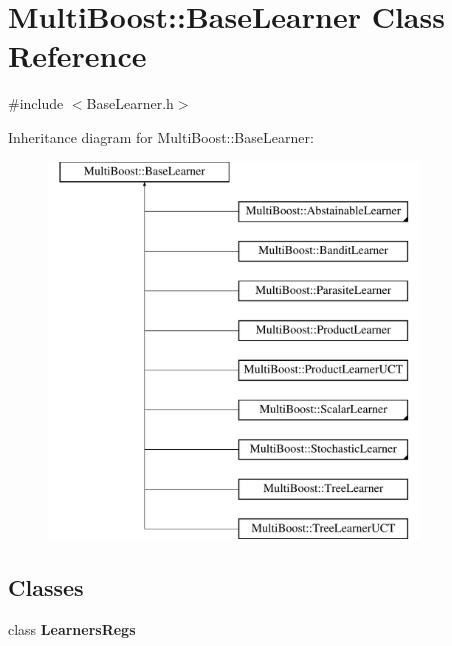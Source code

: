 \hypertarget{classMultiBoost_1_1BaseLearner}{
\section{MultiBoost::BaseLearner Class Reference}
\label{classMultiBoost_1_1BaseLearner}
}


{\ttfamily \#include $<$BaseLearner.h$>$}

Inheritance diagram for MultiBoost::BaseLearner:\begin{figure}[H]
\begin{center}
\leavevmode
\includegraphics[height=10.000000cm]{classMultiBoost_1_1BaseLearner}
\end{center}
\end{figure}
\subsection*{Classes}
\begin{DoxyCompactItemize}
\item 
class {\bfseries LearnersRegs}
\end{DoxyCompactItemize}
